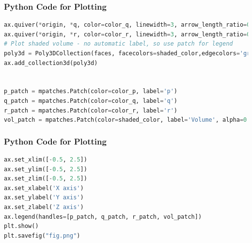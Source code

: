\documentclass{beamer}
\theoremstyle{remark}
\numberwithin{equation}{section}
\begin{document}
\begin{frame}[fragile]
\frametitle{Python Code for Plotting}
\begin{lstlisting}[language=Python]
ax.quiver(*origin, *q, color=color_q, linewidth=3, arrow_length_ratio=0.15)
ax.quiver(*origin, *r, color=color_r, linewidth=3, arrow_length_ratio=0.15)
# Plot shaded volume - no automatic label, so use patch for legend
poly3d = Poly3DCollection(faces, facecolors=shaded_color,edgecolors='gray', linewidths=1.2, alpha=0.7)
ax.add_collection3d(poly3d)


p_patch = mpatches.Patch(color=color_p, label='p')
q_patch = mpatches.Patch(color=color_q, label='q')
r_patch = mpatches.Patch(color=color_r, label='r')
vol_patch = mpatches.Patch(color=shaded_color, label='Volume', alpha=0.7)
\end{lstlisting}
\end{frame}

\begin{frame}[fragile]
\frametitle{Python Code for Plotting}
\begin{lstlisting}[language=Python]
ax.set_xlim([-0.5, 2.5])
ax.set_ylim([-0.5, 2.5])
ax.set_zlim([-0.5, 2.5])
ax.set_xlabel('X axis')
ax.set_ylabel('Y axis')
ax.set_zlabel('Z axis')
ax.legend(handles=[p_patch, q_patch, r_patch, vol_patch])
plt.show()
plt.savefig("fig.png")

\end{lstlisting}
\end{frame}
\end{document}
